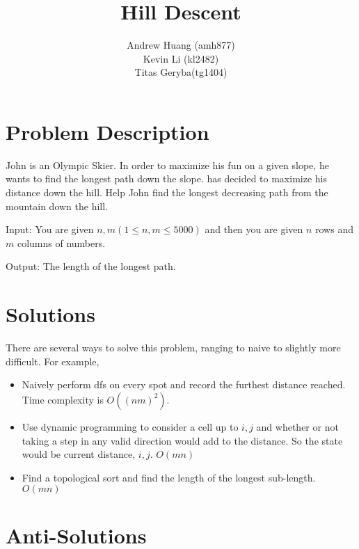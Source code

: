 \documentclass[a4paper,11pt]{article}
\title{Hill Descent}
\author{Andrew Huang (amh877) \\
Kevin Li (kl2482) \\
Titas Geryba(tg1404)}
\begin{document}
\maketitle

\section{Problem Description}

John is an Olympic Skier. In order to maximize his fun on a given slope, he wants to find the longest path down the slope. has decided to maximize his distance down the hill. Help John find the longest decreasing path from the mountain down the hill. 

Input: You are given $n, m (1 \leq n, m \leq 5000)$ and then you are given $n $ rows and $m$ columns of numbers. 

Output: The length of the longest path.



\section{Solutions}

There are several ways to solve this problem, ranging to naive to slightly more difficult.
For example,

\begin{itemize}
    \item Naively perform dfs on every spot and record the furthest distance reached. \\
Time complexity is $O((nm)^2)$.
    \item Use dynamic programming to consider a cell up to $i , j$ and whether or not taking a step in any valid direction would add to the  distance. So the state would be current distance, $i, j$. $O(mn)$
    \item Find a topological sort and find the length of the longest sub-length. $O(mn)$
\end{itemize}


\section{Anti-Solutions}

\end{document}
